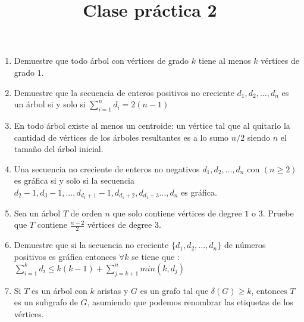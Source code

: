 \documentclass{article}
\begin{document}
\title{Clase pr\'actica 2}
\maketitle

\begin{enumerate}
    \item Demuestre que todo \'arbol con vértices de grado $k$ tiene al menos $k$ vértices de grado $1$.
    
    \item Demuestre que la secuencia de enteros positivos no creciente $d_1, d_2, ..., d_n$ es un \'arbol si y solo si $\sum_{i=1}^{n} d_i = 2(n-1)$
    
    \item En todo \'arbol existe al menos un centroide: un vértice tal que al quitarlo la cantidad de vértices de los \'arboles resultantes es a lo sumo $n/2$ siendo $n$ el tamaño del \'arbol inicial.
    
    \item Una secuencia no creciente de enteros no negativos $d_1, d_2, ..., d_n$ con $(n \geq 2)$ es gr\'afica si y solo si la secuencia $d_2 - 1, d_3 - 1, ..., d_{d_1+1} - 1, d_{d_1 + 2} ,d_{d_1+3} ..., d_n $ es gr\'afica.
    
    \item Sea un árbol $T$ de orden $n$ que solo contiene vértices de degree $1$ o $3$. Pruebe que $T$ contiene $\frac{n-2}{2}$ vértices de degree $3$.

    \item Demuestre que si la secuencia no creciente $\{d_1,d_2,...,d_n\}$ de n\'umeros positivos es gr\'afica entonces $\forall k$ se tiene que : $\sum_{i=1}^{k} d_i \leq k(k-1) + \sum_{j=k+1}^{n} min(k,d_j)$
    
    \item Si $T$ es un \'arbol con $k$ aristas y $G$ es un grafo tal que $\delta(G) \geq k$, entonces $T$ es un subgrafo de $G$, asumiendo que podemos renombrar las etiquetas de los vértices.
 \end{enumerate}
\end{document}
